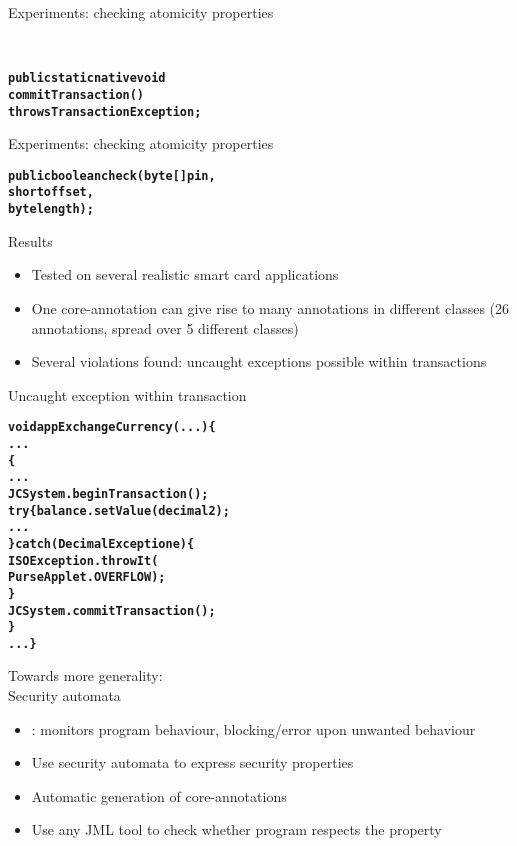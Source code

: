 \documentclass[final,nocolorBG,a4,marieke,nototal,pdf, accumulate,slideColor]{prosper}
\begin{document}
\begin{slide}{Experiments: checking atomicity properties}

\smallskip\\

\begin{alltt}
\textbf{
public static native void 
   commitTransaction() 
         throws TransactionException;}
\end{alltt}
\end{slide}

\begin{slide}{Experiments: checking atomicity properties}
\smallskip\\

\begin{alltt}
\textbf{
public boolean check(byte[] pin, 
                     short offset, 
                     byte length);}
\end{alltt}
\end{slide}

\begin{slide}{Results}
\begin{itemize}
\item Tested on several realistic smart card applications
\item One core-annotation can give rise to many annotations in
different classes (26 annotations, spread over 5 different classes)
\item Several violations found: uncaught exceptions possible within
transactions 
\end{itemize}
\end{slide}

\begin{slide}{Uncaught exception within transaction}
\begin{alltt}
\textbf{void appExchangeCurrency(...) \{
   ...
    \{
      ...
      JCSystem.beginTransaction();	
      try \{balance.setValue(decimal2);
            ...
      \} catch (DecimalException e) \{
         ISOException.throwIt(
              PurseApplet.OVERFLOW);
      \}
      JCSystem.commitTransaction();
   \}
   ...\}}
\end{alltt}
\end{slide}


\begin{slide}{Towards more generality:\\ Security automata}
\begin{itemize}
\item {}: monitors program behaviour,
blocking/error upon unwanted behaviour 
\item Use security automata to express security properties
\item Automatic generation of core-annotations
\item Use any JML tool to check whether program respects the property
\end{itemize}
\end{slide}
\end{document}
